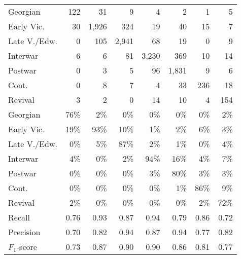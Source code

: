 \begin{table}[!htb]
\begin{tabular}{lrrrrrrr}
Georgian & 122 & 31 & 9 & 4 & 2 & 1 & 5 \\ 
Early Vic. & 30 & 1,926 & 324 & 19 & 40 & 15 & 7 \\ 
  Late V./Edw. & 0 & 105 & 2,941 & 68 & 19 & 0 & 9 \\ 
 Interwar & 6 & 6 & 81 & 3,230 & 369 & 10 & 14 \\ 
 Postwar & 0 & 3 & 5 & 96 & 1,831 & 9 & 6 \\ 
 Cont. & 0 & 8 & 7 & 4 & 33 & 236 & 18 \\ 
 Revival & 3 & 2 & 0 & 14 & 10 & 4 & 154 \\ 
 \midrule
 Georgian & 76\% & 2\% & 0\% & 0\% & 0\% & 0\% & 2\% \\ 
 Early Vic. & 19\% & 93\% & 10\% & 1\% & 2\% & 6\% & 3\% \\ 
  Late V./Edw. & 0\% & 5\% & 87\% & 2\% & 1\% & 0\% & 4\% \\ 
 Interwar & 4\% & 0\% & 2\% & 94\% & 16\% & 4\% & 7\% \\ 
 Postwar & 0\% & 0\% & 0\% & 3\% & 80\% & 3\% & 3\% \\ 
 Cont. & 0\% & 0\% & 0\% & 0\% & 1\% & 86\% & 9\% \\ 
Revival & 2\% & 0\% & 0\% & 0\% & 0\% & 2\% & 72\% \\ 
\midrule
Recall & 0.76 & 0.93 & 0.87 & 0.94 & 0.79 & 0.86 & 0.72 \\ 
 Precision & 0.70 & 0.82 & 0.94 & 0.87 & 0.94 & 0.77 & 0.82 \\ 
$F_1$-score & 0.73 & 0.87 & 0.90 & 0.90 & 0.86 & 0.81 & 0.77 \\ 




\end{tabular}
\end{table}
